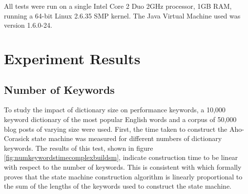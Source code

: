 \documentclass[10pt]{article}
\begin{document}
All tests were run on a single Intel Core 2 Duo 2GHz processor, 1GB
RAM, running a 64-bit Linux 2.6.35 SMP kernel. The Java Virtual
Machine used was version 1.6.0-24. 


\section{Experiment Results}
\label{sec:experimentresults}

\subsection{Number of Keywords}
To study the impact of dictionary size on performance keywords, a
10,000 keyword dictionary of the most popular English words
\cite{wordlist} and a corpus of 50,000 blog posts of varying 
size were used. First, the time taken to construct the Aho-Corasick state
machine was measured for different numbers of dictionary keywords. The
results of this test, shown in figure
\ref{fig:numkeywordstimecomplexbuildsm}, indicate construction time to be
linear with respect to the number of keywords. This is consistent with
\cite{RefWorks:103} which formally proves that the state machine
construction algorithm is linearly proportional to the sum of the
lengths of the keywords used to construct the state machine.
\end{document}
